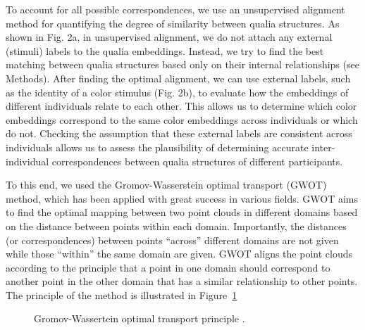 \documentclass[
  authoryear]{elsarticle}
\begin{document}
To account for all possible correspondences, we use an unsupervised
alignment method for quantifying the degree of similarity between qualia
structures. As shown in Fig. 2a, in unsupervised alignment, we do not
attach any external (stimuli) labels to the qualia embeddings. Instead,
we try to find the best matching between qualia structures based only on
their internal relationships (see Methods). After finding the optimal
alignment, we can use external labels, such as the identity of a color
stimulus (Fig. 2b), to evaluate how the embeddings of different
individuals relate to each other. This allows us to determine which
color embeddings correspond to the same color embeddings across
individuals or which do not. Checking the assumption that these external
labels are consistent across individuals allows us to assess the
plausibility of determining accurate inter-individual correspondences
between qualia structures of different participants.

To this end, we used the Gromov-Wasserstein optimal transport (GWOT)
method, which has been applied with great success in various fields.
GWOT aims to find the optimal mapping between two point clouds in
different domains based on the distance between points within each
domain. Importantly, the distances (or correspondences) between points
``across'' different domains are not given while those ``within'' the
same domain are given. GWOT aligns the point clouds according to the
principle that a point in one domain should correspond to another point
in the other domain that has a similar relationship to other points. The
principle of the method is illustrated in Figure~\ref{fig-gwot-kawa}

\begin{figure}


\caption{\label{fig-gwot-kawa}Gromov-Wassertein optimal transport
principle \citep[figure from][]{kawakita2023}.}

\end{figure}%
\end{document}
